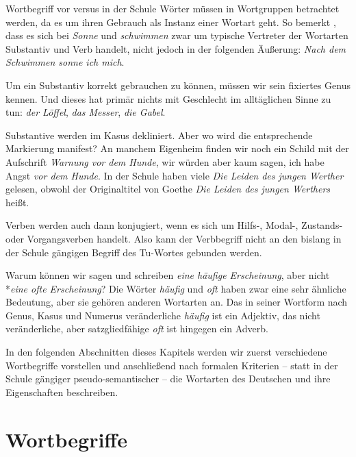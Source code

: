 \begin{Exkurs}{Wortbegriff vor versus in der Schule}
Wörter müssen in Wortgruppen betrachtet werden, da es um ihren Gebrauch als Instanz einer Wortart geht. So bemerkt \citet[12]{Granzow-Emden2006}, dass es sich bei \textit{Sonne} und \textit{schwimmen} zwar um typische Vertreter der Wortarten Substantiv und Verb handelt, nicht jedoch in der folgenden Äußerung: \textit{Nach dem Schwimmen sonne ich mich}. 

Um ein Substantiv korrekt gebrauchen zu können, müssen wir sein fixiertes Genus kennen. Und dieses hat primär nichts mit Geschlecht im alltäglichen Sinne zu tun: \textit{der Löffel}, \textit{das Messer}, \textit{die Gabel}. 

Substantive werden im Kasus dekliniert. Aber wo wird die entsprechende Markierung manifest? An manchem Eigenheim finden wir noch ein Schild mit der Aufschrift \textit{Warnung vor dem Hunde}, wir würden aber kaum sagen, ich habe Angst \textit{vor dem Hunde}. In der Schule haben viele \textit{Die Leiden des jungen Werther} gelesen, obwohl der Originaltitel von Goethe \textit{Die Leiden des jungen Werthers} heißt. 

Verben werden auch dann konjugiert, wenn es sich um Hilfs-, Modal-, Zustands- oder Vorgangsverben handelt. Also kann der Verbbegriff nicht an den bislang in der Schule gängigen Begriff des Tu-Wortes gebunden werden. 

Warum können wir sagen und schreiben \textit{eine häufige Erscheinung}, aber nicht *\textit{eine ofte Erscheinung}? Die Wörter \textit{häufig} und \textit{oft} haben zwar eine sehr ähnliche Bedeutung, aber sie gehören anderen Wortarten an. Das in seiner Wortform nach Genus, Kasus und Numerus veränderliche \textit{häufig} ist ein Adjektiv, das nicht veränderliche, aber satzgliedfähige \textit{oft} ist hingegen ein Adverb. 

In den folgenden Abschnitten dieses Kapitels werden wir zuerst verschiedene Wortbegriffe vorstellen und anschließend nach formalen Kriterien -- statt in der Schule gängiger pseudo-semantischer -- die Wortarten des Deutschen und ihre Eigenschaften beschreiben.          

\end{Exkurs}


\section{Wortbegriffe}\label{section:Wortbegriffe}

